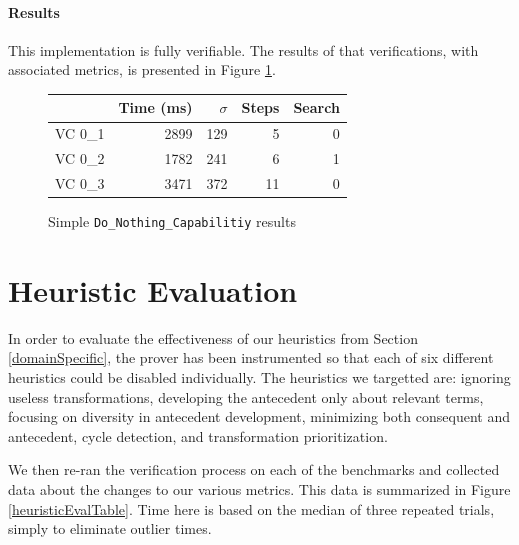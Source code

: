 

\paragraph{Results}This implementation is fully verifiable.  The results of that verifications, with associated metrics, is presented in Figure \ref{fig:treeResults}.

\begin{figure}[h]
	\centering
	\begin{tabular}{lrrrr}
		\toprule
			& Time (ms)	& $\sigma$& Steps & Search \\
		\midrule
		VC 0\_1	& 2899		& 129	& 5 	& 0     \\
		VC 0\_2	& 1782		& 241	& 6 	& 1     \\
		VC 0\_3	& 3471		& 372	& 11 	& 0     \\
		\bottomrule
	\end{tabular}
	\caption{Simple \texttt{Do\_Nothing\_Capabilitiy} results\label{fig:treeResults}}
\end{figure}

\section{Heuristic Evaluation\label{heuristicsEval}}
In order to evaluate the effectiveness of our heuristics from Section \ref{domainSpecific}, the prover has been instrumented so that each of six different heuristics could be disabled individually.  The heuristics we targetted are: ignoring useless transformations, developing the antecedent only about relevant terms, focusing on diversity in antecedent development, minimizing both consequent and antecedent, cycle detection, and transformation prioritization.

We then re-ran the verification process on each of the benchmarks and collected data about the changes to our various metrics.  This data is summarized in Figure \ref{heuristicEvalTable}.  Time here is based on the median of three repeated trials, simply to eliminate outlier times.

